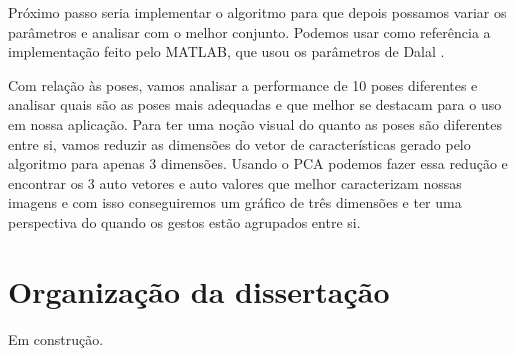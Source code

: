 Próximo passo seria implementar o algoritmo para que depois possamos variar os parâmetros e analisar com o melhor conjunto. Podemos usar como referência a implementação feito pelo MATLAB, que usou os parâmetros de Dalal \cite{dalal}.

Com relação às poses, vamos analisar a performance de 10 poses diferentes e analisar quais são as poses mais adequadas e que melhor se destacam para o uso em nossa aplicação. Para ter uma noção visual do quanto as poses são diferentes entre si, vamos reduzir as dimensões do vetor de características gerado pelo algoritmo para apenas 3 dimensões. Usando o PCA podemos fazer essa redução e encontrar os 3 auto vetores e auto valores que melhor caracterizam nossas imagens e com isso conseguiremos um gráfico de três dimensões e ter uma perspectiva do quando os gestos estão agrupados entre si.

\section{Organização da dissertação}

Em construção.

